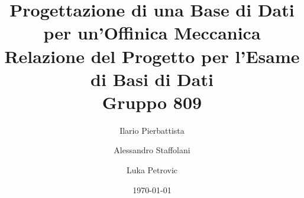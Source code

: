 \documentclass[a4paper]{article}
\theoremstyle{definition}
\begin{document}
\title{Progettazione di una Base di Dati per un'Offinica Meccanica \\
		Relazione del Progetto per l'Esame di Basi di Dati \\
		Gruppo 809
	}
\author{Ilario Pierbattista \and
	Alessandro Staffolani \and
	Luka Petrovic}
\date{\today{}}
\maketitle
\newpage

\tableofcontents
\newpage


\newpage


\newpage


\newpage


\newpage

\end{document}
